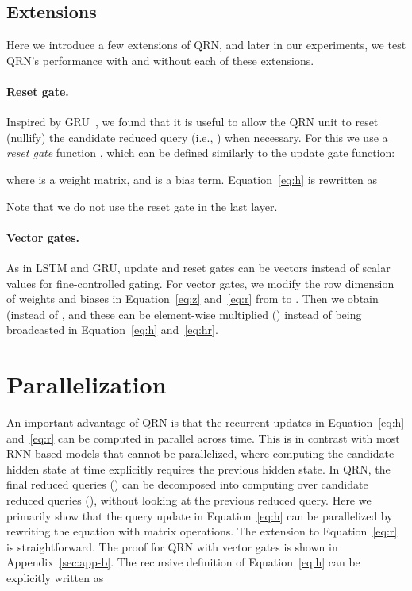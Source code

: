 \documentclass[table]{article}
\begin{document}
\subsection{Extensions}\label{sec:var}
Here we introduce a few extensions of QRN, and later in our experiments, we test QRN's performance with and without each of these extensions.

\paragraph{Reset gate.} Inspired by GRU~\citep{GRU}, we found that it is useful to allow the QRN unit to reset (nullify) the candidate reduced query (i.e., ) when necessary.
For this we use a \emph{reset gate} function , which can be defined similarly to the update gate function:

where  is a weight matrix, and  is a bias term. 
Equation~\ref{eq:h} is rewritten as

Note that we do not use the reset gate in the last layer.


\paragraph{Vector gates.} As in LSTM and GRU, update and reset gates can be vectors instead of scalar values for fine-controlled gating.
For vector gates, we modify the row dimension of weights and biases in Equation~\ref{eq:z} and~\ref{eq:r} from  to .
Then we obtain  (instead of , and these can be element-wise multiplied () instead of being broadcasted in Equation~\ref{eq:h} and~\ref{eq:hr}.





 
\section{Parallelization}\label{sec:par}
An important advantage of QRN is that the recurrent updates in Equation~\ref{eq:h} and~\ref{eq:r}  can be computed in parallel across time. 
This is in contrast with most RNN-based models that cannot be parallelized, where computing the candidate hidden state  at time  explicitly requires the previous hidden state.
In QRN, the final reduced queries () can be decomposed into computing over candidate reduced queries (), without looking at the previous reduced query.
Here we primarily show that the query update in Equation~\ref{eq:h} can be parallelized by rewriting the equation with matrix operations. 
The extension to Equation~\ref{eq:r} is straightforward.
The proof for QRN with vector gates is shown in Appendix~\ref{sec:app-b}.
The recursive definition of Equation~\ref{eq:h} can be explicitly written as
\end{document}
